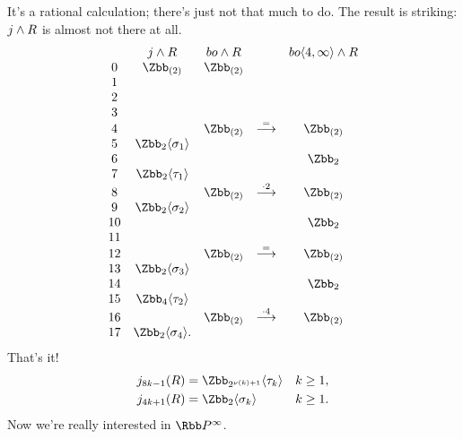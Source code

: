 It's a rational calculation; there's just not that much to do.  The result is striking: $j \wedge R$ is almost not there at all.
\[
\begin{array}{ccccc}
& j \sprod R & bo \sprod R & & bo \langle 4, \infty \rangle \sprod R \\
0 & \Zbb_{(2)} & \Zbb_{(2)} \\
1 \\
2 \\
3 \\
4 & & \Zbb_{(2)} & \stackrel{=}{\to} & \Zbb_{(2)} \\
5 & \Zbb_2 \langle \sigma_1 \rangle \\
6 & & & & \Zbb_2 \\
7 & \Zbb_2 \langle \tau_1 \rangle \\
8 & & \Zbb_{(2)} & \stackrel{\cdot 2}{\to} & \Zbb_{(2)} \\
9 & \Zbb_2 \langle \sigma_2 \rangle \\
10 & & & & \Zbb_2 \\
11 \\
12 & & \Zbb_{(2)} & \stackrel{=}{\to} & \Zbb_{(2)} \\
13 & \Zbb_2 \langle \sigma_3 \rangle \\
14 & & & & \Zbb_2 \\
15 & \Zbb_4 \langle \tau_2 \rangle \\
16 & & \Zbb_{(2)} & \stackrel{\cdot 4}{\to} & \Zbb_{(2)} \\
17 & \Zbb_2 \langle \sigma_4 \rangle.
\end{array}
\]
That's it!
\begin{align*}
j_{8k-1}(R) & = \Zbb_{2^{\nu(k)+1}} \langle \tau_k \rangle & k \ge 1, \\
j_{4k+1}(R) & = \Zbb_2 \langle \sigma_k \rangle & k \ge 1.
\end{align*}
Now we're really interested in $\RP^\infty$.
